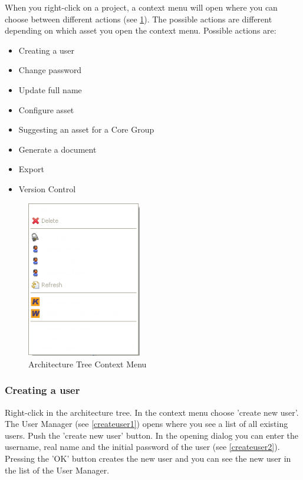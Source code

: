 When you right-click on a project, a context menu will open where you can choose 
between different actions (see \ref{rolekontext}). The possible actions are different
depending on which asset you open the context menu. Possible actions are:

\begin{itemize}
	\item Creating a user
	\item Change password
	\item Update full name
	\item Configure asset
	\item Suggesting an asset for a Core Group
	\item Generate a document
	\item Export
	\item Version Control
\end{itemize}

\begin{figure}[h!]
\begin{center}
\includegraphics[width=5cm]{rolekontext.png}
   \caption{Architecture Tree Context Menu}
\label{rolekontext}
\end{center}
\end{figure}\par


\subsubsection{Creating a user}

Right-click in the architecture tree. In the context menu choose
'create new user'. The User Manager (see \ref{createuser1}) opens where you see a list of all existing users.
Push the 'create new user' button. In the opening dialog you can enter the username, real name and the
initial password of the user (see \ref{createuser2}). Pressing the 'OK' button creates the new user and you
can see the new user in the list of the User Manager.

